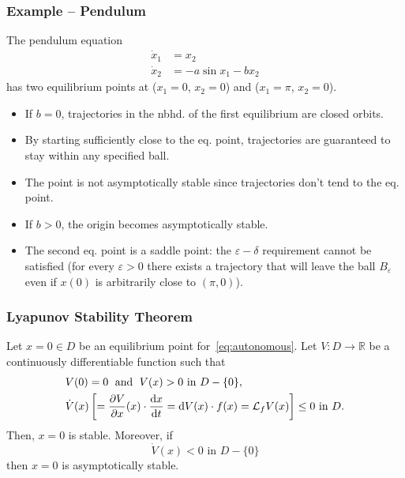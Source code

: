 \begin{frame}
    \frametitle{Example -- Pendulum}

    The pendulum equation
    \begin{align*}
        \dot{x}_1 &= x_2 \\
        \dot{x}_2 &= -a \sin{x_1} - b x_2
    \end{align*}
    has two equilibrium points at ($x_1 = 0$, $x_2 = 0$) and ($x_1 = \pi$, $x_2
    = 0$).
    \begin{itemize}
        \item If $b=0$, trajectories in the nbhd. of the first equilibrium are 
        closed orbits.
        \item By starting sufficiently close to the eq. point, trajectories are 
        guaranteed to stay within any specified ball.
        \item The point is not asymptotically stable since trajectories don't
        tend to the eq. point.
        \item If $b > 0$, the origin becomes asymptotically stable.
        \item The second eq. point is a saddle point: the $\varepsilon-\delta$
        requirement cannot be satisfied (for every $\varepsilon > 0$ there
        exists a trajectory that will leave the ball $B_\varepsilon$ even if
        $x(0)$ is arbitrarily close to $(\pi, 0)$).
    \end{itemize}
\end{frame}


\begin{frame}
    \frametitle{Lyapunov Stability Theorem}

    \begin{theorem}
        Let $x=0 \in D$ be an equilibrium point for~\eqref{eq:autonomous}. Let
        $V: D \rightarrow \mathbb{R}$ be a continuously differentiable function
        such that
        \begin{align*}
            &V(0) = 0 \; \text{ and } \; V(x) > 0 \text{ in } D - \{0\}, \\
            &\dot{V}(x) \left[ = \frac{\partial V}{\partial x}(x) \cdot \frac{\operatorname{d}\! x}{\operatorname{d}\! t} = \operatorname{d}\! 
            V(x) \cdot f(x) = \mathcal{L}_fV(x) \right] \leq 0 \text{ in } D.
        \end{align*}
        Then, $x=0$ is stable. Moreover, if
        \[ \dot{V}(x) < 0 \text{ in } D - \{0\} \] then $x=0$ is asymptotically
        stable.
    \end{theorem}
\end{frame}

